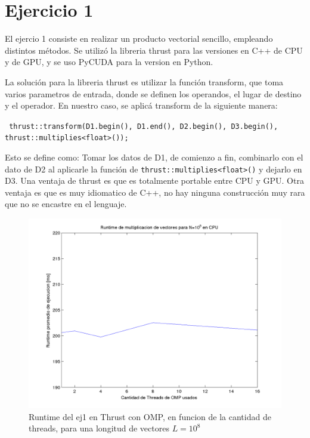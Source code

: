 \section{Ejercicio 1}

El ejercio 1 consiste en realizar un producto vectorial sencillo, empleando distintos m\'etodos.
Se utiliz\'o la libreria thrust para las versiones en C++ de CPU y de GPU, y se uso PyCUDA para
la version en Python.

La soluci\'on para la libreria thrust es utilizar la funci\'on transform, que toma varios parametros
de entrada, donde se definen los operandos, el lugar de destino y el operador. En nuestro caso,
se aplic\'a transform de la siguiente manera:

\texttt{
    thrust::transform(D1.begin(), D1.end(), D2.begin(), D3.begin(),
                       thrust::multiplies<float>());
}

Esto se define como: Tomar los datos de D1, de comienzo a fin, combinarlo con el dato de D2 al aplicarle la funci\'on 
de \texttt{thrust::multiplies<float>()} y dejarlo en D3. Una ventaja de thrust es que es totalmente 
portable entre CPU y GPU. Otra ventaja es que es muy idiomatico de C++, no hay ninguna construcci\'on muy rara
que no se encastre en el lenguaje. 


  \begin{figure}[H]
 \begin {center}
 \includegraphics[width=\hrwidth]{plots/ej1omp.png}
 \end {center}
 \caption{Runtime del ej1 en Thrust con OMP, en funcion de la cantidad de threads, para una longitud de vectores $L=10^8$}
 \label{fig:ej1OMP}
 \end{figure}

